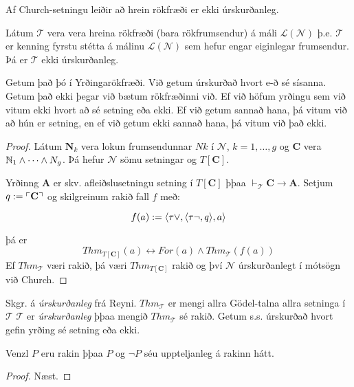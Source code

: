 \documentclass[12pt]{book}
\newcommand{\cT}{\mathcal{T}}
\newcommand{\cL}{\mathcal{L}}
\newcommand{\cN}{\mathcal{N}}
\newcommand{\mb}[1]{\mathbf{#1}}
\newcommand{\bA}{\mathbf{A}}
\newcommand{\bC}{\mathbf{C}}
\newcommand{\vT}{\vdash_{\cT}}
\newcommand{\thT}{Thm_{\cT}}
\DeclarePairedDelimiter{\god}{\ulcorner}{\urcorner}
\begin{document}
Af Church-setningu leiðir að  hrein rökfræði er ekki úrskurðanleg.

\begin{setn}
  Látum $\cT$ vera  vera hreina rökfræði (bara rökfrumsendur)
  á máli $\cL(\cN)$ þ.e.
  $\cT$ er kenning fyrstu stétta á málinu $\cL(\cN)$ sem hefur engar
  eiginlegar frumsendur. Þá er $\cT$ ekki úrskurðanleg.
\end{setn}

\begin{innsk}
  Getum það þó í Yrðingarökfræði. Við getum úrskurðað hvort e-ð sé
  sísanna.
  Getum það ekki þegar við bætum rökfræðinni við.
  Ef við höfum yrðingu sem við vitum ekki hvort að sé setning eða
  ekki.  Ef við getum sannað hana, þá vitum við að hún er setning, en
  ef við getum ekki sannað hana, þá vitum við það ekki.
\end{innsk}

\begin{proof}
  Látum $\mb{N}_k$ vera lokun frumsendunnar
  $Nk$ í $\cN$, $k = 1, \dotsc, g$ og $\bC$ vera
  $\mathbb{N}_1 \wedge \dotsb \wedge N_g$.
  Þá hefur $\cN$ sömu setningar og $T[\bC]$.


  Yrðinng $\bA$ er skv. afleiðslusetningu setning í
  $T[\bC]$ þþaa $\vT \bC \to \bA$.
  Setjum $q := \god{\bC}$ og skilgreinum rakið fall $f$ með:

  \[ f(a) := \langle\tau{\vee},\langle\tau{\lnot},q\rangle,a\rangle \]

  þá er 
  \[ Thm_{T[\bC]} (a) \leftrightarrow For(a) \wedge \thT(f(a)) \]
  Ef $\thT$ væri rakið, þá væri $Thm_{T[\bC]}$ rakið og því
  $\cN$ úrskurðanlegt í mótsögn við Church.

\end{proof}

\begin{skgr}
  Skgr. á \emph{úrskurðanleg} frá Reyni.
  $Thm_{\cT}$ er mengi allra Gödel-talna allra setninga í $\cT$
  $\cT$ er \emph{úrskurðanleg} þþaa mengið $Thm_{\cT}$ sé rakið.
  Getum s.s. úrskurðað hvort gefin yrðing sé setning eða ekki.
\end{skgr}


\begin{setn}
  Venzl $P$ eru rakin þþaa  $P$ og $\lnot P$ séu uppteljanleg á
  rakinn hátt.
\end{setn}

\begin{proof}
  Næst.
\end{proof}
  
\end{document}

